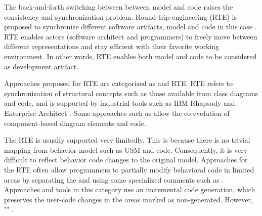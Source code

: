 

The back-and-forth switching between between model and code raises the consistency and synchronization problem.
Round-trip engineering (RTE) \cite{Hettel2008} is proposed to synchronize different software artifacts, model and code in this case \cite{Sendall}. 
RTE enables actors (software architect and programmers) to freely move between different representations and stay efficient with their favorite working environment. 
In other words, RTE enables both model and code to be considered as development artifact. 


Approaches proposed for RTE are categorized as  and  RTE.
 RTE refers to synchronization of structural concepts such as those available from class diagrams and code, and is supported by industrial tools such as IBM Rhapsody \cite{ibm_rhapsody} and Enterprise Architect \cite{sparxsystems_enterprise_2014}.
Some approaches such as \cite{langhammer2013co, kramer2015change} allow the co-evolution of component-based diagram elements and code.

The  RTE is usually supported very limitedly. 
This is because there is no trivial mapping from behavior model such as USM and code.
Consequently, it is very difficult to reflect behavior code changes to the original model.
Approaches for the  RTE often allow programmers to partially modify behavioral code in limited areas by separating the  and  \cite{ibm_rhapsody,steinberg2008emf} using some specialized comments such as .
Approaches and tools in this category use an incremental code generation, which preserves the user-code changes in the areas marked as non-generated.
However, "" \cite{zheng2012enhancing}.


